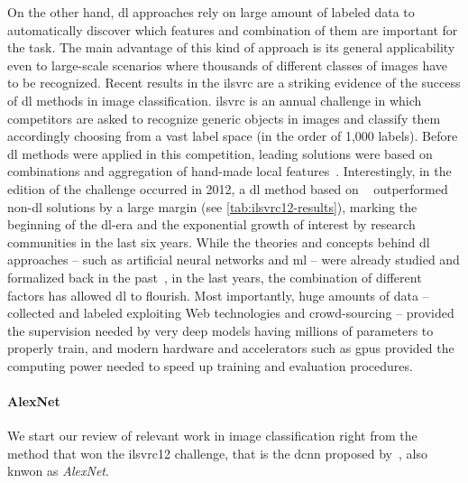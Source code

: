On the other hand, \acrlong{dl} approaches rely on large amount of labeled data to automatically discover which features and combination of them are important for the task.
The main advantage of this kind of approach is its general applicability even to large-scale scenarios where thousands of different classes of images have to be recognized.
Recent results in the \gls{ilsvrc} are a striking evidence of the success of \gls{dl} methods in image classification.
\gls{ilsvrc} is an annual challenge in which competitors are asked to recognize generic objects in images and classify them accordingly choosing from a vast label space (in the order of 1,000 labels).
Before \gls{dl} methods were applied in this competition, leading solutions were based on combinations and aggregation of hand-made local features~\cite{}.
Interestingly, in the edition of the challenge occurred in 2012, a \gls{dl} method based on ~\cite{} outperformed non-\gls{dl} solutions by a large margin (see \ref{tab:ilsvrc12-results}), marking the beginning of the \gls{dl}-era
and the exponential growth of interest by research communities in the last six years.
While the theories and concepts behind \gls{dl} approaches -- such as artificial neural networks and \acrlong{ml} -- were already studied and formalized back in the past~\cite{}, in the last years, the combination of different factors has allowed \acrlong{dl} to flourish.
Most importantly, huge amounts of data -- collected and labeled exploiting Web technologies and crowd-sourcing -- provided the supervision needed by very deep models having millions of parameters to properly train, and modern hardware and accelerators such as \glspl{gpu} provided the computing power needed to speed up training and evaluation procedures.

\paragraph{AlexNet}
We start our review of relevant work in image classification right from the method that won the \gls{ilsvrc}12 challenge, that is the \gls{dcnn} proposed by~\citet{krizhevsky2012imagenet}, also knwon as \emph{AlexNet}.

